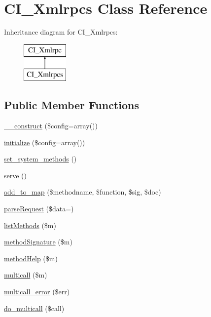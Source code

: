 \hypertarget{class_c_i___xmlrpcs}{}\section{C\+I\+\_\+\+Xmlrpcs Class Reference}
\label{class_c_i___xmlrpcs}
Inheritance diagram for C\+I\+\_\+\+Xmlrpcs\+:\begin{figure}[H]
\begin{center}
\leavevmode
\includegraphics[height=2.000000cm]{class_c_i___xmlrpcs}
\end{center}
\end{figure}
\subsection*{Public Member Functions}
\begin{DoxyCompactItemize}
\item 
\mbox{\hyperlink{class_c_i___xmlrpcs_af7f9493844d2d66e924e3c1df51ce616}{\+\_\+\+\_\+construct}} (\$config=array())
\item 
\mbox{\hyperlink{class_c_i___xmlrpcs_a481385e36d920f5a5005ace05c6cd016}{initialize}} (\$config=array())
\item 
\mbox{\hyperlink{class_c_i___xmlrpcs_a858a05529612358b8f63c88b08b414d0}{set\+\_\+system\+\_\+methods}} ()
\item 
\mbox{\hyperlink{class_c_i___xmlrpcs_aa9e0b443b9575f62bf9f8e85b1742c96}{serve}} ()
\item 
\mbox{\hyperlink{class_c_i___xmlrpcs_a73b29191620c55a5e2d3fda3a5c3cf44}{add\+\_\+to\+\_\+map}} (\$methodname, \$function, \$sig, \$doc)
\item 
\mbox{\hyperlink{class_c_i___xmlrpcs_a8a0c34554b9238be766ab85f55519b6e}{parse\+Request}} (\$data=\textquotesingle{}\textquotesingle{})
\item 
\mbox{\hyperlink{class_c_i___xmlrpcs_ad640f0b44d1956a05cfe40bab4e4043d}{list\+Methods}} (\$m)
\item 
\mbox{\hyperlink{class_c_i___xmlrpcs_a9f96cc0bd3338094174eb22cd90d6f2a}{method\+Signature}} (\$m)
\item 
\mbox{\hyperlink{class_c_i___xmlrpcs_a97626f30e860f4a63463f8674827dc00}{method\+Help}} (\$m)
\item 
\mbox{\hyperlink{class_c_i___xmlrpcs_a122ce829a1aa3f0041f922ec5feb95c8}{multicall}} (\$m)
\item 
\mbox{\hyperlink{class_c_i___xmlrpcs_a4cf545e6c15e1487b223346b18ca017d}{multicall\+\_\+error}} (\$err)
\item 
\mbox{\hyperlink{class_c_i___xmlrpcs_ab76189ac2d65f1e3ab6d65128e3748d5}{do\+\_\+multicall}} (\$call)
\end{DoxyCompactItemize}
